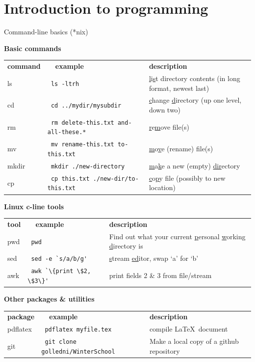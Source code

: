 

\section{Introduction to programming}
\begin{frame}{\insertsectionnumber{ |} Command-line basics (*nix)}

\hspace*{-0.5cm}\textbf{Basic commands} \\
\vspace*{0.15cm}\begin{tabular}{p{0.75cm} p{6cm} p{3.5cm}}
\textbf{command} & \textbf{~~example} & \textbf{description} \\
ls & \Verb+ ls -ltrh + & \ul{l}i\ul{s}t directory contents (in long format, newest last) \\
cd & \Verb+ cd ../mydir/mysubdir + & \ul{c}hange \ul{d}irectory (up one level, down two) \\
rm & \Verb+ rm delete-this.txt and-all-these.* + & \ul{r}e\ul{m}ove file(s) \\
mv & \Verb+ mv rename-this.txt to-this.txt + & \ul{m}o\ul{v}e (rename) file(s) \\
mkdir & \Verb+ mkdir ./new-directory + & \ul{m}a\ul{k}e a new (empty) \ul{dir}ectory  \\
cp & \Verb+ cp this.txt ./new-dir/to-this.txt + & \ul{c}o\ul{p}y file (possibly to new location) \\
\end{tabular}


\vspace*{0.35cm}\hspace*{-0.5cm}\textbf{Linux c-line tools} \\
\vspace*{0.15cm}\begin{tabular}{p{0.75cm} p{6cm} p{3.5cm}}
\textbf{tool} & \textbf{~~example} & \textbf{description} \\
pwd & \Verb+ pwd + & Find out what your current \ul{p}ersonal \ul{w}orking \ul{d}irectory is \\
sed & \Verb+ sed -e `s/a/b/g'+ & \ul{s}tream \ul{ed}itor, swap `a' for `b' \\
awk & \Verb+ awk `\{print \$2, \$3\}'+ & print fields 2 \& 3 from file/stream \\
\end{tabular}

\vspace*{0.35cm}\hspace*{-0.5cm}\textbf{Other packages \& utilities} \\
\vspace*{0.15cm}\begin{tabular}{p{0.75cm} p{6cm} p{3.5cm}}
\textbf{package} & \textbf{~~example} & \textbf{description} \\
pdflatex & \Verb+ pdflatex myfile.tex + & compile \LaTeX ~document \\
git & \Verb+ git clone golledni/WinterSchool + & Make a local copy of a github repository \\
\end{tabular}



\end{frame}
